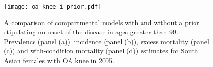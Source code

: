     \begin{figure}[h]
        \begin{center}
            \texttt{[image: oa\_knee-i\_prior.pdf]}
            \caption{A comparison of compartmental models with and without a prior stipulating no onset of the disease in ages greater than 99.  Prevalence (panel (a)), incidence (panel (b)), excess mortality (panel (c)) and with-condition mortality (panel (d)) estimates for South Asian females with OA knee in 2005.}
            \label{fig:app-oa knee priors}
        \end{center}
    \end{figure} 